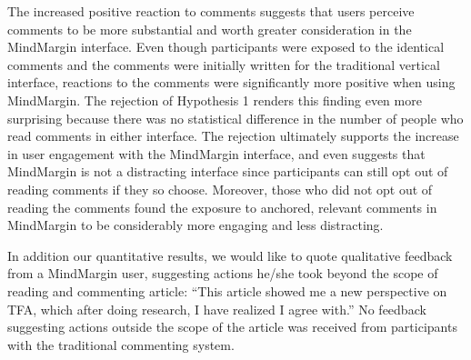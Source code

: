The increased positive reaction to comments suggests that users perceive comments to be more substantial and worth greater consideration in the MindMargin interface. Even though participants were exposed to the identical comments and the comments were initially written for the traditional vertical interface, reactions to the comments were significantly more positive when using MindMargin. The rejection of Hypothesis 1 renders this finding even more surprising because there was no statistical difference in the number of people who read comments in either interface. The rejection ultimately supports the increase in user engagement with the MindMargin interface, and even suggests that MindMargin is not a distracting interface since participants can still opt out of reading comments if they so choose. Moreover, those who did not opt out of reading the comments found the exposure to anchored, relevant comments in MindMargin to be considerably more engaging and less distracting. 

In addition our quantitative results, we would like to quote qualitative feedback from a MindMargin user, suggesting actions he/she took beyond the scope of reading and commenting article: “This article showed me a new perspective on TFA, which after doing research, I have realized I agree with.” No feedback suggesting actions outside the scope of the article was received from participants with the traditional commenting system. 
